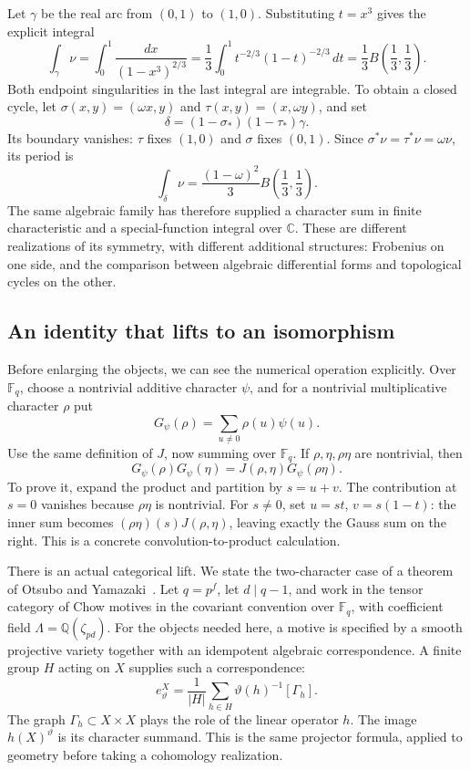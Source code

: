 \documentclass[11pt]{article}
\theoremstyle{remark}
\begin{document}
Let \(\gamma\) be the real arc from \((0,1)\) to \((1,0)\). Substituting \(t=x^3\) gives the explicit integral
\begin{equation}
\int_\gamma\nu
=\int_0^1\frac{dx}{(1-x^3)^{2/3}}
=\frac13\int_0^1t^{-2/3}(1-t)^{-2/3}\,dt
=\frac13B\!\left(\frac13,\frac13\right).
\label{fermat:beta}
\end{equation}
Both endpoint singularities in the last integral are integrable. To obtain a closed cycle, let \(\sigma(x,y)=(\omega x,y)\) and \(\tau(x,y)=(x,\omega y)\), and set
\[
\delta=(1-\sigma_*)(1-\tau_*)\gamma.
\]
Its boundary vanishes: \(\tau\) fixes \((1,0)\) and \(\sigma\) fixes \((0,1)\). Since \(\sigma^*\nu=\tau^*\nu=\omega\nu\), its period is
\begin{equation}
\int_\delta\nu
=\frac{(1-\omega)^2}{3}
B\!\left(\frac13,\frac13\right).
\label{fermat:closed-period}
\end{equation}
The same algebraic family has therefore supplied a character sum in finite characteristic and a special-function integral over \(\mathbb C\). These are different realizations of its symmetry, with different additional structures: Frobenius on one side, and the comparison between algebraic differential forms and topological cycles on the other.

\subsection{An identity that lifts to an isomorphism}

Before enlarging the objects, we can see the numerical operation explicitly. Over \(\mathbb F_q\), choose a nontrivial additive character \(\psi\), and for a nontrivial multiplicative character \(\rho\) put
\[
G_\psi(\rho)=\sum_{u\ne0}\rho(u)\psi(u).
\]
Use the same definition of \(J\), now summing over \(\mathbb F_q\). If \(\rho,\eta,\rho\eta\) are nontrivial, then
\begin{equation}
G_\psi(\rho)G_\psi(\eta)
=J(\rho,\eta)G_\psi(\rho\eta).
\label{fermat:gauss-jacobi}
\end{equation}
To prove it, expand the product and partition by \(s=u+v\). The contribution at \(s=0\) vanishes because \(\rho\eta\) is nontrivial. For \(s\ne0\), set \(u=st\), \(v=s(1-t)\): the inner sum becomes \((\rho\eta)(s)J(\rho,\eta)\), leaving exactly the Gauss sum on the right. This is a concrete convolution-to-product calculation.

There is an actual categorical lift. We state the two-character case of a theorem of Otsubo and Yamazaki~\cite{otsubo-yamazaki}. Let \(q=p^f\), let \(d\mid q-1\), and work in the tensor category of Chow motives in the covariant convention over \(\mathbb F_q\), with coefficient field \(\Lambda=\mathbb Q(\zeta_{pd})\). For the objects needed here, a motive is specified by a smooth projective variety together with an idempotent algebraic correspondence. A finite group \(H\) acting on \(X\) supplies such a correspondence:
\[
e_\vartheta^X=\frac1{|H|}\sum_{h\in H}
\vartheta(h)^{-1}[\Gamma_h].
\]
The graph \(\Gamma_h\subset X\times X\) plays the role of the linear operator \(h\). The image \(h(X)^\vartheta\) is its character summand. This is the same projector formula, applied to geometry before taking a cohomology realization.
\end{document}
